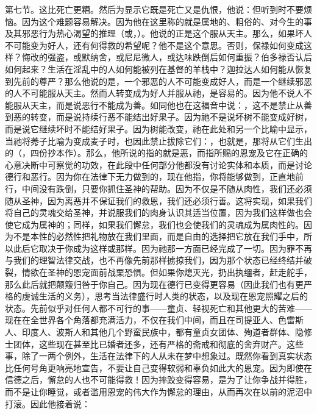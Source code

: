 第七节。这比死亡更糟。然后为显示它既是死亡又是仇恨，他说：但听到时不要烦恼。因为这个难题容易解决。因为他在这里称的就是属地的、粗俗的、对今生的事及其邪恶行为热心渴望的推理（或，）。他说的正是这个服从天主。那么，如果坏人不可能变为好人，还有何得救的希望呢？他不是这个意思。否则，保禄如何变成这样？悔改的强盗，或默纳舍，或尼尼微人，或达味跌倒后如何重振？伯多禄否认后如何起来？生活在淫乱中的人如何能被列在基督的羊栈中？迦拉达人如何能从恢复到先前的尊严？那么他说的是，一个邪恶的人不可能变成好人，而是一个继续邪恶的人不可能服从天主。然而人转变成为好人并服从祂，是容易的。因为他不说人不能服从天主，而是说恶行不能成为善。如同他也在这福音中说：，这不是禁止从善到恶的转变，而是说持续行恶不能结出好果子。因为祂不是说坏树不能变成好树，而是说它继续坏时不能结好果子。因为树能改变，祂在此处和另一个比喻中显示，当祂将莠子比喻为变成麦子时，也因此禁止拔除它们：，也就是，那将从它们生出的（，四份抄本作）。那么，他所说的指的就是恶，而指所赐的恩宠及它在正确的心意决断中可察觉的功效，在此段中任何部分他都没有讨论实体和本质，而是讨论德行和恶行。因为你在法律下无力做到的，现在他指，你将能够做到，正直地前行，中间没有跌倒，只要你抓住圣神的帮助。因为不仅是不随从肉性，我们还必须随从圣神，因为离恶并不保证我们的救恩，我们还必须行善。这将实现，如果我们将自己的灵魂交给圣神，并说服我们的肉身认识其适当位置，因为我们这样做也会使它成为属神的；同样，如果我们懈怠，我们也会使我们的灵魂成为属肉性的。因为不是本性的必然性把礼物放在我们里面，而是自由的选择把它放在我们手中，所以此后它取决于你成为这样或那样。因为祂那一方面已经完成了一切。因为罪不再与我们的理智法律交战，也不再像先前那样掳掠我们，因为那个状态已经终结并破裂，情欲在圣神的恩宠面前战栗恐惧。但如果你熄灭光，扔出执缰者，赶走舵手，那么此后就把颠簸归咎于你自己。因为现在德行已变得更容易（因此我们也有更严格的虔诚生活的义务），思考当法律盛行时人类的状态，以及现在恩宠照耀之后的状态。先前似乎对任何人都不可行的事——童贞、轻视死亡和其他更大的苦难——现在在全世界各个角落都充满活力，不仅在我们中间，而且在司提亚人、色雷斯人、印度人、波斯人和其他几个野蛮民族中，都有童贞女团体、殉道者群体、隐修士团体，这些现在甚至比已婚者还多，还有严格的斋戒和彻底的舍弃财产。这些事，除了一两个例外，生活在法律下的人从未在梦中想象过。既然你看到真实状态比任何号角更响亮地宣告，不要让自己变得软弱和辜负如此大的恩宠。因为即使在信德之后，懈怠的人也不可能得救！因为摔跤变得容易，是为了让你争战并得胜，而不是让你睡觉，或者滥用恩宠的伟大作为懈怠的理由，从而再次在以前的泥沼中打滚。因此他接着说：\par

